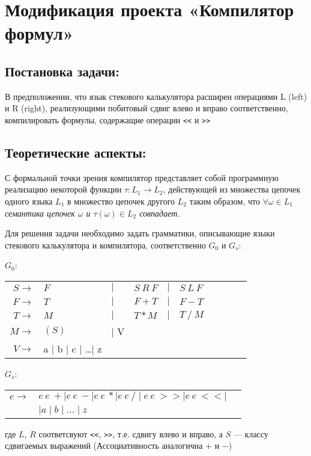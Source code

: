 
\section{Модификация проекта «Компилятор формул»}
\subsection{Постановка задачи:}
В предположении, что язык стекового калькулятора
расширен операциями L (left) и R (right),
реализующими побитовый сдвиг влево и вправо соответственно, компилировать
формулы, содержащие операции \verb|<<| и \verb|>>|

\subsection{Теоретические аспекты:}
С формальной точки зрения компилятор представляет собой программную реализацию
некоторой функции $\tau\colon L_1 \rightarrow L_2$, действующей из множества
цепочек одного языка $L_1$ в множество цепочек другого $L_2$ таким образом, что
$\forall \omega \in L_1$ {\em семантика цепочек $\omega$ и $\tau(\omega)\in L_2$
 совпадает.}

Для решения задачи необходимо задать грамматики, описывающие языки стекового
калькулятора и компилятора, соответственно $G_0$ и $G_s$:

$G_0$:
\medskip
\noindent\hspace{2cm}
\begin{tabular}{rlllllllll}
$S \rightarrow$ & $F $&$\mid$&$ S~R~F$&$\mid$&$ S~L~F$\\
$F \rightarrow$ & $T $&$\mid$&$ F+T$&$\mid$&$ F-T$\\
$T \rightarrow$ & $M $&$\mid$&$ T*M$&$\mid$&$ T~/~M$\\
$M \rightarrow$ & $(S)$&$\mid$ V\\
$V \rightarrow$ & a $\mid$ b $\mid$ c $\mid$ \dots $\mid$ z\\
\end{tabular}
\medskip

$G_s$:
\medskip
\noindent\hspace{2cm}
\begin{tabular}{rll}
$e\rightarrow$ & $e~e~+ \mid e~e~-\mid e~e~* \mid e~e~/ \mid e~e~>>\mid e~e~<<\mid$\\
&$\mid a \mid b \mid \dots \mid z$
\end{tabular}

 где $L$, $R$ соответсвуют \verb|<<|, \verb|>>|, т.е. сдвигу влево и вправо,
 а $S$ --- классу сдвигаемых выражений (Ассоциативность аналогична $+$ и $-$)

